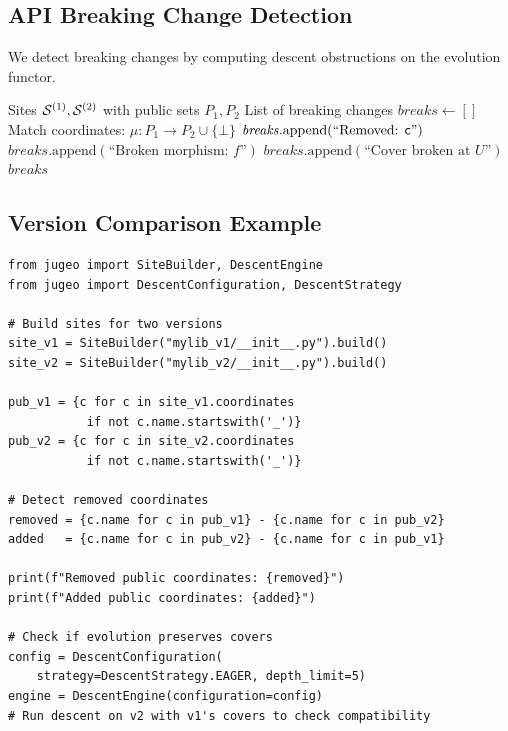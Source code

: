 \documentclass[11pt]{article}
\begin{document}
\subsection{API Breaking Change Detection}

We detect breaking changes by computing descent obstructions on the
evolution functor.

\begin{algorithm}[H]
\caption{API Breaking Change Detection}\label{alg:breaking-change}
\begin{algorithmic}[1]
\REQUIRE Sites $\mathcal{S}^{(1)}, \mathcal{S}^{(2)}$ with public sets $P_1, P_2$
\ENSURE List of breaking changes
\STATE $\mathit{breaks} \leftarrow []$
\STATE Match coordinates: $\mu : P_1 \to P_2 \cup \{\bot\}$
  \IF{$\mu(\coord) = \bot$}
    \STATE $\mathit{breaks}.\mathrm{append}(\text{``Removed: } \mathsf{c}\text{''})$
  \ENDIF
\ENDFOR
{}
    \STATE $\mathit{breaks}.\mathrm{append}(\text{``Broken morphism: } f\text{''})$
  \ENDIF
\ENDFOR
{}
    \STATE $\mathit{breaks}.\mathrm{append}(\text{``Cover broken at } U\text{''})$
  \ENDIF
\ENDFOR
\RETURN $\mathit{breaks}$
\end{algorithmic}
\end{algorithm}

\subsection{Version Comparison Example}

\begin{lstlisting}[style=jugeo-python]
from jugeo import SiteBuilder, DescentEngine
from jugeo import DescentConfiguration, DescentStrategy

# Build sites for two versions
site_v1 = SiteBuilder("mylib_v1/__init__.py").build()
site_v2 = SiteBuilder("mylib_v2/__init__.py").build()

pub_v1 = {c for c in site_v1.coordinates
           if not c.name.startswith('_')}
pub_v2 = {c for c in site_v2.coordinates
           if not c.name.startswith('_')}

# Detect removed coordinates
removed = {c.name for c in pub_v1} - {c.name for c in pub_v2}
added   = {c.name for c in pub_v2} - {c.name for c in pub_v1}

print(f"Removed public coordinates: {removed}")
print(f"Added public coordinates: {added}")

# Check if evolution preserves covers
config = DescentConfiguration(
    strategy=DescentStrategy.EAGER, depth_limit=5)
engine = DescentEngine(configuration=config)
# Run descent on v2 with v1's covers to check compatibility
\end{lstlisting}
\end{document}
